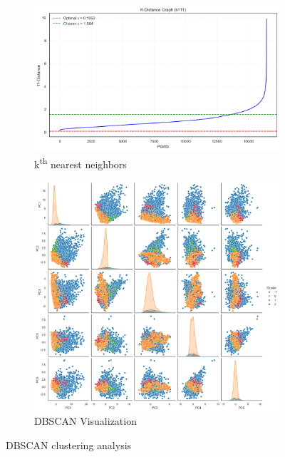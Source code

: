 \begin{figure}[H]
    \centering
    \begin{subfigure}[b]{0.49\textwidth}
        \centering
        \includegraphics[width=\textwidth]{plots/DBSCAN_kth_graph.png}
        \caption{k\textsuperscript{th} nearest neighbors}
        \label{fig:DBSCAN_kth_graph}
    \end{subfigure}
    \begin{subfigure}[b]{0.49\textwidth}
        \centering
        \includegraphics[width=\textwidth]{plots/DBSCAN_provvisoria.png}
        \caption{DBSCAN Visualization}
        \label{fig:DBSCAN_provvisoria}
    \end{subfigure}
    \caption{DBSCAN clustering analysis}
    \label{fig:three_subplots}
\end{figure}





